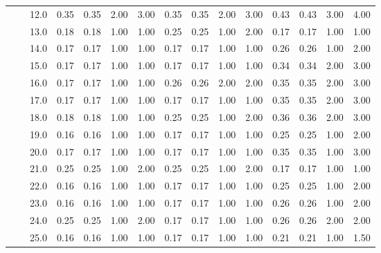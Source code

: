 \begin{tabular}{lllrrrrrrrrrrrr}
       &     & 12.0 &       0.35 &      0.35 & 2.00 &   3.00 &       0.35 &      0.35 & 2.00 &   3.00 &       0.43 &      0.43 & 3.00 &   4.00 \\
       &     & 13.0 &       0.18 &      0.18 & 1.00 &   1.00 &       0.25 &      0.25 & 1.00 &   2.00 &       0.17 &      0.17 & 1.00 &   1.00 \\
       &     & 14.0 &       0.17 &      0.17 & 1.00 &   1.00 &       0.17 &      0.17 & 1.00 &   1.00 &       0.26 &      0.26 & 1.00 &   2.00 \\
       &     & 15.0 &       0.17 &      0.17 & 1.00 &   1.00 &       0.17 &      0.17 & 1.00 &   1.00 &       0.34 &      0.34 & 2.00 &   3.00 \\
       &     & 16.0 &       0.17 &      0.17 & 1.00 &   1.00 &       0.26 &      0.26 & 2.00 &   2.00 &       0.35 &      0.35 & 2.00 &   3.00 \\
       &     & 17.0 &       0.17 &      0.17 & 1.00 &   1.00 &       0.17 &      0.17 & 1.00 &   1.00 &       0.35 &      0.35 & 2.00 &   3.00 \\
       &     & 18.0 &       0.18 &      0.18 & 1.00 &   1.00 &       0.25 &      0.25 & 1.00 &   2.00 &       0.36 &      0.36 & 2.00 &   3.00 \\
       &     & 19.0 &       0.16 &      0.16 & 1.00 &   1.00 &       0.17 &      0.17 & 1.00 &   1.00 &       0.25 &      0.25 & 1.00 &   2.00 \\
       &     & 20.0 &       0.17 &      0.17 & 1.00 &   1.00 &       0.17 &      0.17 & 1.00 &   1.00 &       0.35 &      0.35 & 1.00 &   3.00 \\
       &     & 21.0 &       0.25 &      0.25 & 1.00 &   2.00 &       0.25 &      0.25 & 1.00 &   2.00 &       0.17 &      0.17 & 1.00 &   1.00 \\
       &     & 22.0 &       0.16 &      0.16 & 1.00 &   1.00 &       0.17 &      0.17 & 1.00 &   1.00 &       0.25 &      0.25 & 1.00 &   2.00 \\
       &     & 23.0 &       0.16 &      0.16 & 1.00 &   1.00 &       0.17 &      0.17 & 1.00 &   1.00 &       0.26 &      0.26 & 1.00 &   2.00 \\
       &     & 24.0 &       0.25 &      0.25 & 1.00 &   2.00 &       0.17 &      0.17 & 1.00 &   1.00 &       0.26 &      0.26 & 2.00 &   2.00 \\
       &     & 25.0 &       0.16 &      0.16 & 1.00 &   1.00 &       0.17 &      0.17 & 1.00 &   1.00 &       0.21 &      0.21 & 1.00 &   1.50 \\

\end{tabular}
